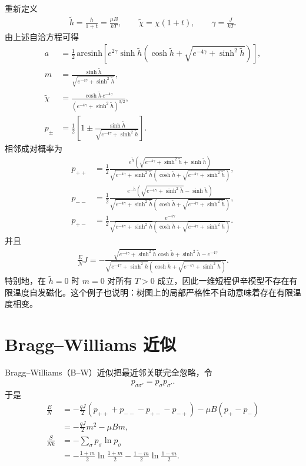 重新定义
\begin{align*}
	\widetilde h=\frac{h}{1+t}=\frac{\mu B}{kT},\qquad
	\widetilde\chi=\chi(1+t),\qquad
\gamma=\frac J{kT}.
\end{align*}
由上述自洽方程可得
\begin{align*}
a&=\frac12\,\mathrm{arcsinh}\left[
e^{2\gamma}\sinh\widetilde h
\left(\cosh\widetilde h+
\sqrt{e^{-4\gamma}+\sinh^2\widetilde h}\right)
\right],\\
m&=\frac{\sinh\widetilde h}
{\sqrt{e^{-4\gamma}+\sinh^2\widetilde h}},\\
\widetilde\chi
&=\frac{\cosh\widetilde h\,e^{-4\gamma}}
{\left(e^{-4\gamma}+\sinh^2\widetilde h\right)^{3/2}},\\
p_\pm&=\frac12\left[
1\pm\frac{\sinh\widetilde h}
{\sqrt{e^{-4\gamma}+\sinh^2\widetilde h}}\right].
\end{align*}
相邻成对概率为
\begin{align*}
p_{++}
&=\frac12\frac{e^{\widetilde h}
\left(\sqrt{e^{-4\gamma}+\sinh^2\widetilde h}
+\sinh\widetilde h\right)}
{\sqrt{e^{-4\gamma}+\sinh^2\widetilde h}
\left(\cosh\widetilde h+
\sqrt{e^{-4\gamma}+\sinh^2\widetilde h}\right)},\\
p_{--}
&=\frac12\frac{e^{-\widetilde h}
\left(\sqrt{e^{-4\gamma}+\sinh^2\widetilde h}
-\sinh\widetilde h\right)}
{\sqrt{e^{-4\gamma}+\sinh^2\widetilde h}
\left(\cosh\widetilde h+
\sqrt{e^{-4\gamma}+\sinh^2\widetilde h}\right)},\\
p_{+-}
&=\frac12\frac{e^{-4\gamma}}
{\sqrt{e^{-4\gamma}+\sinh^2\widetilde h}
\left(\cosh\widetilde h+
\sqrt{e^{-4\gamma}+\sinh^2\widetilde h}\right)}.
\end{align*}
并且
\begin{align*}
\frac ENJ
=-\frac{
\sqrt{e^{-4\gamma}+\sinh^2\widetilde h}\cosh\widetilde h
+\sinh^2\widetilde h-e^{-4\gamma}}
{\sqrt{e^{-4\gamma}+\sinh^2\widetilde h}
\left(\cosh\widetilde h+
\sqrt{e^{-4\gamma}+\sinh^2\widetilde h}\right)}.
\end{align*}
特别地，在 \(\widetilde h=0\) 时 \(m=0\) 对所有 \(T>0\) 成立，因此一维短程伊辛模型不存在有限温度自发磁化。这个例子也说明：树图上的局部严格性不自动意味着存在有限温度相变。

\section{Bragg--Williams 近似}

Bragg--Williams（B--W）近似把最近邻关联完全忽略，令
\begin{align*}
	p_{\sigma\sigma'}=p_\sigma p_{\sigma'}.
\end{align*}
于是
\begin{align*}
\frac EN
&=-\frac{qJ}{2}
\left(p_{++}+p_{--}-p_{+-}-p_{-+}\right)
-\mu B(p_+-p_-)\\
&=-\frac{qJ}{2}m^2-\mu Bm,\\
\frac S{Nk}
&=-\sum_\sigma p_\sigma\ln p_\sigma\\
&=-\frac{1+m}{2}\ln\frac{1+m}{2}
-\frac{1-m}{2}\ln\frac{1-m}{2}.
\end{align*}

